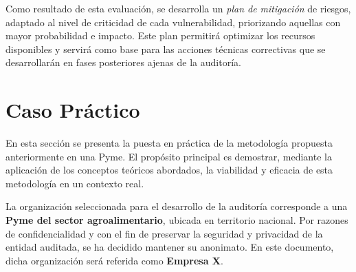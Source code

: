 \documentclass[a4paper, 11pt]{article}
\begin{document}
\vspace{0.5cm}


Como resultado de esta evaluación, se desarrolla un \textit{plan de mitigación} de riesgos, adaptado al nivel 
de criticidad de cada vulnerabilidad, priorizando aquellas con mayor probabilidad e impacto. Este plan permitirá optimizar los recursos 
disponibles y servirá como base para las acciones técnicas correctivas que se desarrollarán en fases posteriores ajenas de la auditoría.


\vspace{0.5cm}








































\clearpage
\thispagestyle{nohead}




\section{Caso Práctico}

En esta sección se presenta la puesta en práctica de la metodología propuesta anteriormente en una Pyme. El propósito principal es demostrar, mediante la aplicación de los conceptos teóricos abordados, la viabilidad y eficacia de esta metodología en un contexto real.

\par\vspace{0.5cm}

La organización seleccionada para el desarrollo de la auditoría corresponde a una \textbf{Pyme del sector agroalimentario}, ubicada en territorio nacional. Por razones de confidencialidad y con el fin de preservar la seguridad y privacidad de la entidad auditada, se ha decidido mantener su anonimato. En este documento, dicha organización será referida como \textbf{Empresa X}.
\end{document}
